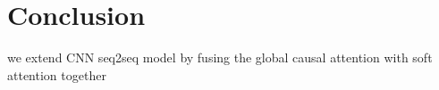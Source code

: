 \section{Conclusion}
we extend CNN seq2seq model by fusing the global causal attention with soft attention together